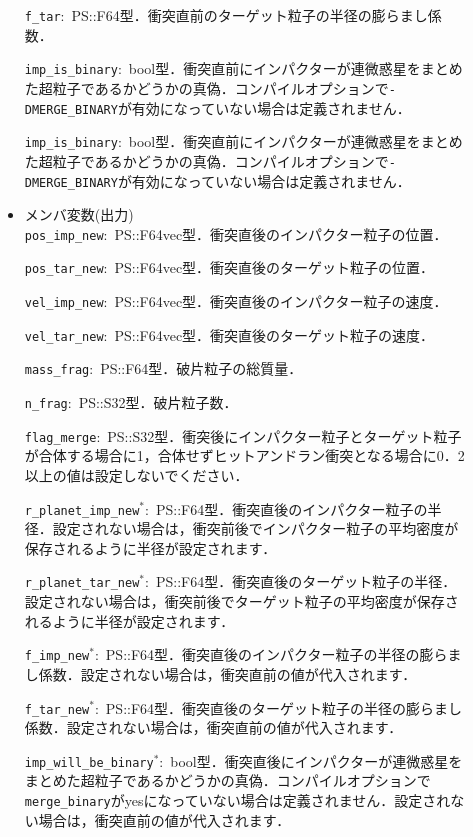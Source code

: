 \documentclass[12pt,a4paper,dvipdfmx]{jsarticle}
\begin{document}
\begin{description}
\begin{itemize}
\texttt{f\_tar}:\ PS::F64型．衝突直前のターゲット粒子の半径の膨らまし係数．

\texttt{imp\_is\_binary}:\ bool型．衝突直前にインパクターが連微惑星をまとめた超粒子であるかどうかの真偽．コンパイルオプションで\texttt{-DMERGE\_BINARY}が有効になっていない場合は定義されません．

\texttt{imp\_is\_binary}:\ bool型．衝突直前にインパクターが連微惑星をまとめた超粒子であるかどうかの真偽．コンパイルオプションで\texttt{-DMERGE\_BINARY}が有効になっていない場合は定義されません．
\\

\item
メンバ変数(出力)\\
\texttt{pos\_imp\_new}:\ PS::F64vec型．衝突直後のインパクター粒子の位置．

\texttt{pos\_tar\_new}:\ PS::F64vec型．衝突直後のターゲット粒子の位置．

\texttt{vel\_imp\_new}:\ PS::F64vec型．衝突直後のインパクター粒子の速度．

\texttt{vel\_tar\_new}:\ PS::F64vec型．衝突直後のターゲット粒子の速度．

\texttt{mass\_frag}:\ PS::F64型．破片粒子の総質量．

\texttt{n\_frag}:\ PS::S32型．破片粒子数．

\texttt{flag\_merge}:\ PS::S32型．衝突後にインパクター粒子とターゲット粒子が合体する場合に1，合体せずヒットアンドラン衝突となる場合に0．2以上の値は設定しないでください．

\texttt{r\_planet\_imp\_new}${}^{*}$:\ PS::F64型．衝突直後のインパクター粒子の半径．設定されない場合は，衝突前後でインパクター粒子の平均密度が保存されるように半径が設定されます．

\texttt{r\_planet\_tar\_new}${}^{*}$:\ PS::F64型．衝突直後のターゲット粒子の半径．設定されない場合は，衝突前後でターゲット粒子の平均密度が保存されるように半径が設定されます．

\texttt{f\_imp\_new}${}^{*}$:\ PS::F64型．衝突直後のインパクター粒子の半径の膨らまし係数．設定されない場合は，衝突直前の値が代入されます．

\texttt{f\_tar\_new}${}^{*}$:\ PS::F64型．衝突直後のターゲット粒子の半径の膨らまし係数．設定されない場合は，衝突直前の値が代入されます．

\texttt{imp\_will\_be\_binary}${}^{*}$:\ bool型．衝突直後にインパクターが連微惑星をまとめた超粒子であるかどうかの真偽．コンパイルオプションで\texttt{merge\_binary}がyesになっていない場合は定義されません．設定されない場合は，衝突直前の値が代入されます．


\end{itemize}
\end{description}
\end{document}
